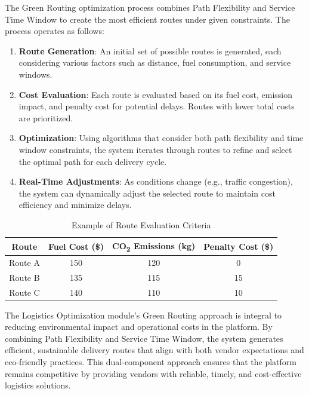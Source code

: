 The Green Routing optimization process combines Path Flexibility and Service Time Window to create the most efficient routes under given constraints. The process operates as follows:

\begin{enumerate}
    \item \textbf{Route Generation}: An initial set of possible routes is generated, each considering various factors such as distance, fuel consumption, and service windows.
    
    \item \textbf{Cost Evaluation}: Each route is evaluated based on its fuel cost, emission impact, and penalty cost for potential delays. Routes with lower total costs are prioritized.
    
    \item \textbf{Optimization}: Using algorithms that consider both path flexibility and time window constraints, the system iterates through routes to refine and select the optimal path for each delivery cycle.
    
    \item \textbf{Real-Time Adjustments}: As conditions change (e.g., traffic congestion), the system can dynamically adjust the selected route to maintain cost efficiency and minimize delays.
\end{enumerate}

\begin{table}[H]
\centering
\caption{Example of Route Evaluation Criteria}
\begin{tabular}{|c|c|c|c|}
\hline
\textbf{Route} & \textbf{Fuel Cost (\$)} & \textbf{CO\textsubscript{2} Emissions (kg)} & \textbf{Penalty Cost (\$)} \\ \hline
Route A & 150 & 120 & 0 \\ \hline
Route B & 135 & 115 & 15 \\ \hline
Route C & 140 & 110 & 10 \\ \hline
\end{tabular}
\end{table}
The Logistics Optimization module’s Green Routing approach is integral to reducing environmental impact and operational costs in the platform. By combining Path Flexibility and Service Time Window, the system generates efficient, sustainable delivery routes that align with both vendor expectations and eco-friendly practices. This dual-component approach ensures that the platform remains competitive by providing vendors with reliable, timely, and cost-effective logistics solutions.

